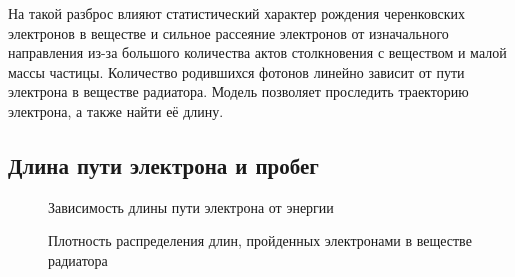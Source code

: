 \documentclass[12pt,a4paper]{report} %
\begin{document}
На такой разброс влияют статистический характер рождения черенковских электронов в веществе и сильное рассеяние электронов от изначального направления из-за большого количества актов столкновения с веществом и малой массы частицы. Количество родившихся фотонов линейно зависит от пути электрона в веществе радиатора. Модель позволяет проследить траекторию электрона, а также найти её длину.
\subsection{Длина пути электрона и пробег}
\begin{figure}[b]
\caption{Зависимость длины пути электрона от энергии}
\label{pic:length}
\caption{Плотность распределения длин, пройденных электронами в веществе радиатора}
\end{figure}
\end{document}
